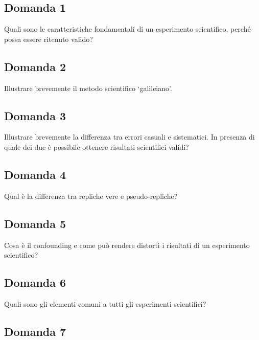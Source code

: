 \documentclass[a4paper,12pt,oneside]{book}
\begin{document}
\hypertarget{domanda-1}{%
\subsection{Domanda 1}\label{domanda-1}}

Quali sono le caratteristiche fondamentali di un esperimento scientifico, perché possa essere ritenuto valido?

\hypertarget{domanda-2}{%
\subsection{Domanda 2}\label{domanda-2}}

Illustrare brevemente il metodo scientifico `galileiano'.

\hypertarget{domanda-3}{%
\subsection{Domanda 3}\label{domanda-3}}

Illustrare brevemente la differenza tra errori casuali e sistematici. In presenza di quale dei due è possibile ottenere risultati scientifici validi?

\hypertarget{domanda-4}{%
\subsection{Domanda 4}\label{domanda-4}}

Qual è la differenza tra repliche vere e pseudo-repliche?

\hypertarget{domanda-5}{%
\subsection{Domanda 5}\label{domanda-5}}

Cosa è il confounding e come può rendere distorti i risultati di un esperimento scientifico?

\hypertarget{domanda-6}{%
\subsection{Domanda 6}\label{domanda-6}}

Quali sono gli elementi comuni a tutti gli esperimenti scientifici?

\hypertarget{domanda-7}{%
\subsection{Domanda 7}\label{domanda-7}}
\end{document}
